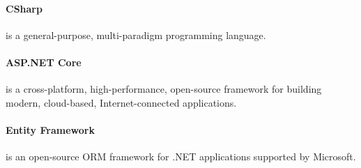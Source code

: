 \paragraph{CSharp}
is a general-purpose, multi-paradigm programming language.
\paragraph{ASP.NET Core}
is a cross-platform, high-performance, open-source framework for building modern, cloud-based, Internet-connected applications.
\paragraph{Entity Framework}
is an open-source ORM framework for .NET applications supported by Microsoft.
